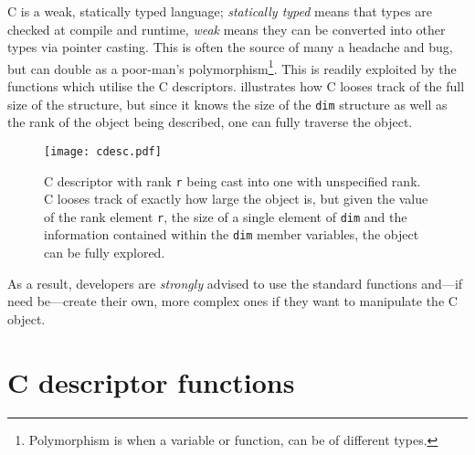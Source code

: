 C is a weak, statically typed language; \emph{statically typed} means that types are checked at compile and runtime, \emph{weak} means they can be converted into other types via pointer casting. This is often the source of many a headache and bug, but can double as a poor-man's polymorphism\footnote{Polymorphism is when a variable or function, can be of different types.}. This is readily exploited by the functions which utilise the C descriptors.  illustrates how C looses track of the full size of the structure, but since it knows the size of the \texttt{dim} structure as well as the rank of the object being described, one can fully traverse the object.
\begin{figure}
    \centering
    \texttt{[image: cdesc.pdf]}
    \caption[C descriptor with rank \texttt{r} being cast into one with unspecified rank.]{C descriptor with rank \texttt{r} being cast into one with unspecified rank. C looses track of exactly how large the object is, but given the value of the rank element \texttt{r}, the size of a single element of \texttt{dim} and the information contained within the \texttt{dim} member variables, the object can be fully explored.}
    \label{f:cast}
\end{figure}
As a result, developers are \emph{strongly} advised to use the standard functions and---if need be---create their own, more complex ones if they want to manipulate the C object.

\section{C descriptor functions}

